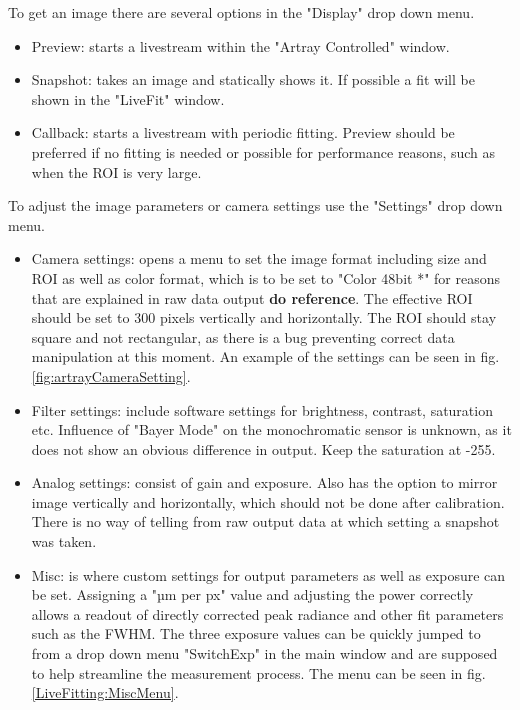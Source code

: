 \documentclass[twoside,openright]{scrreprt}
\begin{document}
{To get an image there are several options in the "Display" drop down menu.
\begin{itemize}
\item Preview: starts a livestream within the "Artray Controlled" window.
\item Snapshot: takes an image and statically shows it. If possible a fit will be shown in the "LiveFit" window.
\item Callback: starts a livestream with periodic fitting. Preview should be preferred if no fitting is needed or possible for performance reasons, such as when the ROI is very large.
\end{itemize}

To adjust the image parameters or camera settings use the "Settings" drop down menu.
\begin{itemize}
\item Camera settings: opens a menu to set the image format including size and ROI as well as color format, which is to be set to "Color 48bit *" for reasons that are explained in raw data output \textbf{do reference}. The effective ROI should be set to 300 pixels vertically and horizontally. The ROI should stay square and not rectangular, as there is a bug preventing correct data manipulation at this moment. An example of the settings can be seen in fig. \ref{fig:artrayCameraSetting}.
\item Filter settings: include software settings for brightness, contrast, saturation etc. Influence of "Bayer Mode" on the monochromatic sensor is unknown, as it does not show an obvious difference in output. Keep the saturation at -255.
\item Analog settings: consist of gain and exposure. Also has the option to mirror image vertically and horizontally, which should not be done after calibration. There is no way of telling from raw output data at which setting a snapshot was taken.
\item Misc: is where custom settings for output parameters as well as exposure can be set. Assigning a "µm per px" value and adjusting the power correctly allows a readout  of directly corrected peak radiance and other fit parameters such as the FWHM. The three exposure values can be quickly jumped to from a drop down menu "SwitchExp" in the main window and are supposed to help streamline the measurement process. The menu can be seen in fig. \ref{LiveFitting:MiscMenu}.
\end{itemize}

}
\end{document}
